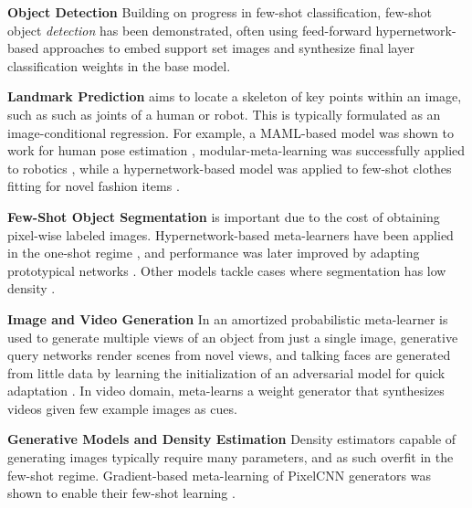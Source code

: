 \documentclass[10pt,journal,compsoc]{IEEEtran}
\newcommand{\keypoint}[1]{\vspace{0.1cm}\noindent\textbf{#1}\quad}
\begin{document}
\keypoint{Object Detection} Building on progress in few-shot classification, few-shot object \emph{detection} \cite{perezrua2020once,kang2019fsldet} has been demonstrated, often using feed-forward hypernetwork-based approaches to embed support set images and synthesize final layer classification weights in the base model.

\keypoint{Landmark Prediction} aims to locate a skeleton of key points within an image, such as such as joints of a  human or robot. This is typically formulated as an image-conditional regression. For example, a MAML-based model was shown to work for human pose estimation \cite{gui2018motionprediction}, modular-meta-learning was successfully applied to robotics \cite{alet2018modularmetalearning}, while a hypernetwork-based model was applied to few-shot clothes fitting for novel fashion items \cite{perezrua2020once}.

\keypoint{Few-Shot Object Segmentation} is important due to the cost of obtaining pixel-wise labeled images. Hypernetwork-based meta-learners have been applied in the one-shot regime \cite{shaban2017oneshotsegmentation}, and performance was later improved by adapting prototypical networks \cite{dong2018fewshotss}. Other models tackle cases where segmentation has low density \cite{ rakelly2018fewshotsegmentation}.

\keypoint{Image and Video Generation} In \cite{gordon2018metaprobainference} an amortized probabilistic meta-learner is used to generate multiple views of an object from just a single image, generative query networks \cite{eslami2018neuralGQN} render scenes from novel views, and talking faces are generated from little data by learning the initialization of an adversarial model for quick adaptation \cite{zakharov2019talkingheads}. In video domain,  \cite{wang2019few} meta-learns a weight generator that synthesizes videos given few example images as cues.


\keypoint{Generative Models and Density Estimation} Density estimators capable of generating images typically require many parameters, and as such overfit in the few-shot regime. Gradient-based meta-learning of PixelCNN generators was shown to enable their few-shot learning \cite{reed2017fewshotdensityestimation}. 
\end{document}
